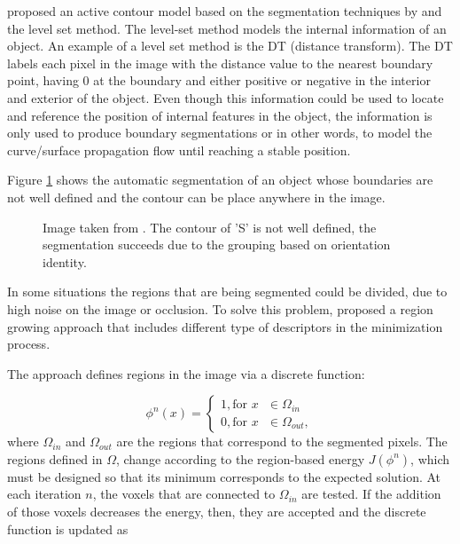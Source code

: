 \cite{chan2001active} proposed an active contour model based on the segmentation 
techniques by \cite{mumford1989optimal} and the level set method. 
The level-set method 
models the internal information of an object.
An example of a level set method is the DT (distance transform).
The DT labels each pixel in the image with the distance value to the nearest boundary point, 
having $0$ at the boundary and either positive or negative in the interior and exterior of the object. 
Even though this information could be 
used to locate and reference the position of internal features in the object, 
the information is only used to 
produce boundary segmentations 
or in other words, to model the curve/surface propagation flow until reaching a stable position.

Figure \ref{fig:chanveseS} shows the automatic segmentation of an object whose boundaries are not well defined and 
the contour can be place anywhere in the image.

\begin{figure} 
 \centering 
 \caption[Segmentation with orientation.]{Image taken from \cite{chan2001active}. The contour of 'S' is not well defined, the segmentation succeeds due to the grouping based on orientation identity.}
 \label{fig:chanveseS}  
\end{figure}

In some situations the regions that are being segmented could be divided, due to high noise on the image or occlusion.
To solve this problem, \cite{jeanvariational} proposed a region growing approach that includes
different type of descriptors in the minimization process.

The approach defines regions in the image via a discrete function:

\begin{equation}
  \phi^{n}(x) =  \begin{cases}
			   1, \text{for $x$ } \in \Omega_{in} \\
			   0, \text{for $x$ } \in \Omega_{out}, 
		 \end{cases} 
   \label{equ:vrgRose}
\end{equation}
where $\Omega_{in}$ and $\Omega_{out}$ are the regions that correspond to the segmented pixels.
The regions defined in $\Omega$, change according to the region-based energy $J(\phi^{n})$, which must
be designed so that its minimum corresponds to the expected solution. At each iteration $n$, the voxels that are connected to $\Omega_{in}$
are tested. If the addition of those voxels decreases the energy, then, they are accepted and the discrete function is updated as


